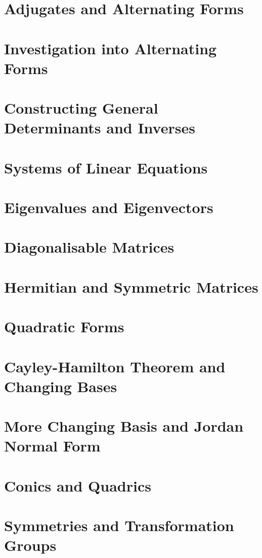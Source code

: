 \documentclass{article}
\begin{document}
\section{Adjugates and Alternating Forms}

\section{Investigation into Alternating Forms}

\section{Constructing General Determinants and Inverses}

\section{Systems of Linear Equations}

\section{Eigenvalues and Eigenvectors}

\section{Diagonalisable Matrices}

\section{Hermitian and Symmetric Matrices}

\section{Quadratic Forms}

\section{Cayley-Hamilton Theorem and Changing Bases}

\section{More Changing Basis and Jordan Normal Form}

\section{Conics and Quadrics}

\section{Symmetries and Transformation Groups}

\end{document}
